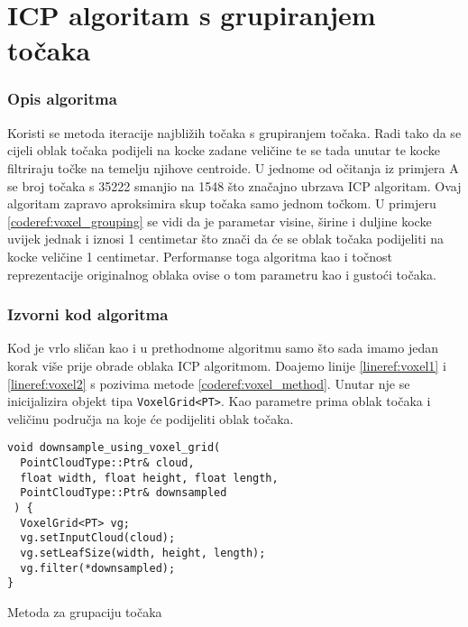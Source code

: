 \section{ICP algoritam s grupiranjem točaka}

\subsubsection{Opis algoritma}
Koristi se metoda iteracije najbližih točaka s grupiranjem točaka\cite{pcl:voxelgrid}. Radi tako da se cijeli oblak točaka podijeli na kocke zadane veličine te se tada unutar te kocke filtriraju točke na temelju njihove centroide\cite{wiki:Centroid}. U jednome od očitanja iz primjera A se broj točaka s 35222 smanjio na 1548 što značajno ubrzava ICP algoritam. Ovaj algoritam zapravo aproksimira skup točaka samo jednom točkom. U primjeru \ref{coderef:voxel_grouping} se vidi da je parametar visine, širine i duljine kocke uvijek jednak i iznosi 1 centimetar što znači da će se oblak točaka podijeliti na kocke veličine 1 centimetar. Performanse toga algoritma kao i točnost reprezentacije originalnog oblaka ovise o tom parametru kao i gustoći točaka.


\subsubsection{Izvorni kod algoritma}
Kod je vrlo sličan kao i u prethodnome algoritmu samo što sada imamo jedan korak više prije obrade oblaka ICP algoritmom. Doajemo linije \ref{lineref:voxel1} i \ref{lineref:voxel2} s pozivima metode \ref{coderef:voxel_method}. Unutar nje se inicijalizira objekt tipa \texttt{VoxelGrid<PT>}. Kao parametre prima oblak točaka i veličinu područja na koje će podijeliti oblak točaka.

\begin{listing}[H]
  \begin{verbatim}
void downsample_using_voxel_grid(
  PointCloudType::Ptr& cloud,
  float width, float height, float length,
  PointCloudType::Ptr& downsampled
 ) {
  VoxelGrid<PT> vg;
  vg.setInputCloud(cloud);
  vg.setLeafSize(width, height, length);
  vg.filter(*downsampled);
}
  \end{verbatim}
  \caption{Metoda za grupaciju točaka}
  \label{coderef:voxel_method}
\end{listing}

